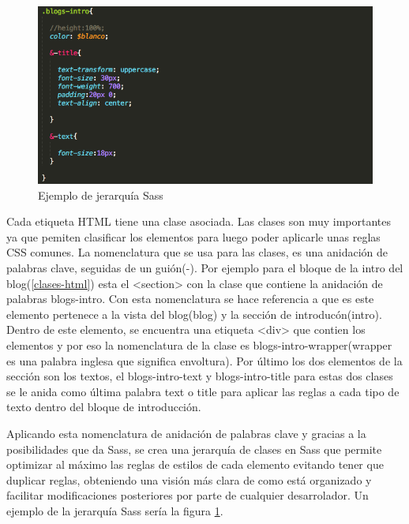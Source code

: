 \begin{figure}
\begin{center}
\includegraphics[width=1.0\textwidth]{imagenes/jerarquia-sass.png}
\caption{Ejemplo de jerarquía Sass}
\label{jerarquia-sass}
\end{center}
\end{figure}

Cada etiqueta HTML tiene una clase asociada. Las clases son muy importantes ya que pemiten clasificar los elementos para luego poder aplicarle unas reglas CSS comunes. La nomenclatura que se usa para las clases, es una anidación de palabras clave, seguidas de un guión(-). Por ejemplo para el bloque de la intro del blog(\ref{clases-html}) esta el <section> con la clase que contiene la anidación de palabras blogs-intro. Con esta nomenclatura se hace referencia a que es este elemento pertenece a la vista del blog(blog) y la sección de introducón(intro). Dentro de este elemento, se encuentra una etiqueta <div> que contien los elementos y por eso la nomenclatura de la clase es blogs-intro-wrapper(wrapper es una palabra inglesa que significa envoltura). Por último los dos elementos de la sección son los textos, el blogs-intro-text y blogs-intro-title para estas dos clases se le anida como última palabra text o title para aplicar las reglas a cada tipo de texto dentro del bloque de introducción.

\vspace{5 mm}

Aplicando esta nomenclatura de anidación de palabras clave y gracias a la posibilidades que da Sass, se crea una jerarquía de clases en Sass que permite optimizar al máximo las reglas de estilos de cada elemento evitando tener que duplicar reglas, obteniendo una visión más clara de como está organizado y facilitar modificaciones posteriores por parte de cualquier desarrolador. Un ejemplo de la jerarquía Sass sería la figura \ref{jerarquia-sass}.


